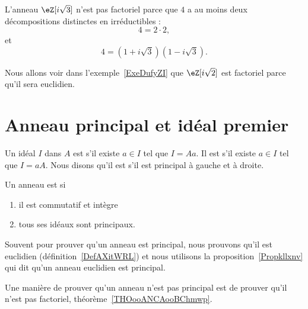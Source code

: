 \begin{example} \label{EXooCWJUooCDJqkr}
    L'anneau \( \eZ[i\sqrt{3}]\) n'est pas factoriel parce que \( 4\) a au moins deux décompositions distinctes en irréductibles :
    \begin{equation}
        4=2\cdot 2,
    \end{equation}
    et
    \begin{equation}
        4=(1+i\sqrt{3})(1-i\sqrt{3}).
    \end{equation}
\end{example}

Nous allons voir dans l'exemple~\ref{ExeDufyZI} que \( \eZ[i\sqrt{2}]\) est factoriel parce qu'il sera euclidien.

\section{Anneau principal et idéal premier}

\begin{definition}      \label{DEFooMZRKooBPLAWH}
    Un idéal \( I\) dans \( A\) est  s'il existe \( a\in I\) tel que \( I= A a\). Il est  s'il existe \( a\in I\) tel que \( I=a A\). Nous disons qu'il est  s'il est principal à gauche et à droite.
\end{definition}

\begin{definition}          \label{DEFooGWOZooXzUlhK}
    Un anneau est  si
    \begin{enumerate}
        \item
            il est commutatif et intègre
        \item
            tous ses idéaux sont principaux.
    \end{enumerate}
\end{definition}

Souvent pour prouver qu'un anneau est principal, nous prouvons qu'il est euclidien (définition~\ref{DefAXitWRL}) et nous utilisons la proposition~\ref{Propkllxnv} qui dit qu'un anneau euclidien est principal.

Une manière de prouver qu'un anneau n'est pas principal est de prouver qu'il n'est pas factoriel, théorème~\ref{THOooANCAooBChmwp}.

